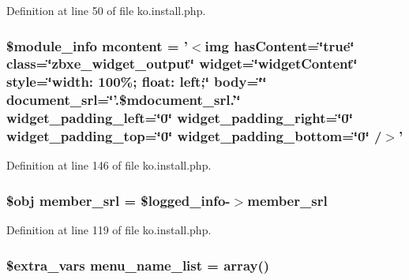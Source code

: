 Definition at line 50 of file ko.\+install.\+php.

\hypertarget{ko_8install_8php_a9da4bb6e77356bb68ae0e05dbd9f5e2f}{
\subsubsection[{mcontent}]{\setlength{\rightskip}{0pt plus 5cm}\$module\+\_\+info {\bf mcontent} = '$<$img has\+Content=\char`\"{}true\char`\"{} class=\char`\"{}zbxe\+\_\+widget\+\_\+output\char`\"{} widget=\char`\"{}widget\+Content\char`\"{} style=\char`\"{}width\+: 100\%; float\+: left;\char`\"{} body=\char`\"{}\char`\"{} document\+\_\+srl=\char`\"{}'.\$mdocument\+\_\+srl.'\char`\"{} widget\+\_\+padding\+\_\+left=\char`\"{}0\char`\"{} widget\+\_\+padding\+\_\+right=\char`\"{}0\char`\"{} widget\+\_\+padding\+\_\+top=\char`\"{}0\char`\"{} widget\+\_\+padding\+\_\+bottom=\char`\"{}0\char`\"{} /$>$'}}\label{ko_8install_8php_a9da4bb6e77356bb68ae0e05dbd9f5e2f}


Definition at line 146 of file ko.\+install.\+php.

\hypertarget{ko_8install_8php_aa61f9e08f0fe505094d26f8143f30bbd}{
\subsubsection[{member\+\_\+srl}]{\setlength{\rightskip}{0pt plus 5cm}\$obj member\+\_\+srl = \$logged\+\_\+info-\/$>$member\+\_\+srl}}\label{ko_8install_8php_aa61f9e08f0fe505094d26f8143f30bbd}


Definition at line 119 of file ko.\+install.\+php.

\hypertarget{ko_8install_8php_a9223cf55eb6ff5239c0396968e619fbe}{
\subsubsection[{menu\+\_\+name\+\_\+list}]{\setlength{\rightskip}{0pt plus 5cm}\${\bf extra\+\_\+vars} menu\+\_\+name\+\_\+list = array()}}\label{ko_8install_8php_a9223cf55eb6ff5239c0396968e619fbe}


